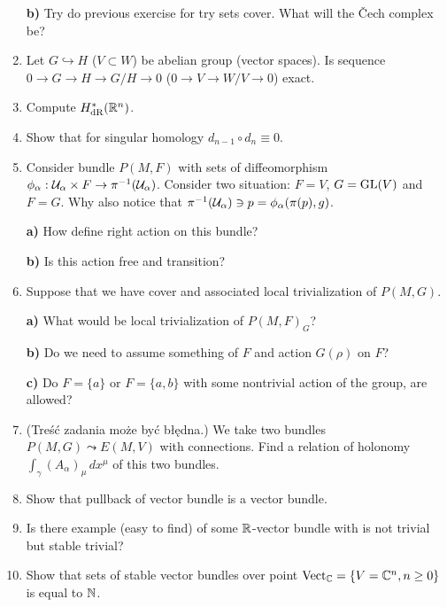 \documentclass[a4paper,11pt]{article}
\begin{document}
\begin{enumerate}
  \textbf{b)} Try do previous exercise for try sets cover. What will
  the \v{C}ech complex be?

\item Let $G \hookrightarrow H$ ($V \subset W$) be abelian group (vector spaces). Is
  sequence $0 \to G \to H \to G / H \to 0$ ($0 \to V \to W / V \to 0$) exact.

\item Compute $H_{ \textrm{dR} }^{ * }( \mathbb{R}^{ n } )$.

\item Show that for singular homology $d_{ n - 1 } \circ d_{ n } \equiv 0$.

\item Consider bundle $P( M, F )$ with sets of diffeomorphism
  $\phi_{ \alpha } : \mathcal{U}_{ \alpha } \times F \to \pi^{ -1 }( \mathcal{U}_{
    \alpha } )$. Consider two situation: $F = V$, $G = \mathrm{GL}( V )$ and
  $F = G$. Why also notice that
  $\pi^{ -1 }( \mathcal{U}_{ \alpha } ) \ni p = \phi_{ \alpha }( \pi( p ), g )$.

  \textbf{a)} How define right action on this bundle?

  \textbf{b)} Is this action free and transition?

\item Suppose that we have cover and associated local trivialization
  of $P( M, G )$.

  \textbf{a)} What would be local trivialization of $P( M, F )_{ G }$?

  \textbf{b)} Do we need to assume something of $F$ and action
  $G( \rho )$ on $F$?

  \textbf{c)} Do $F = \{ a \}$ or $F = \{ a, b \}$ with some nontrivial
  action of the group, are allowed?

\item (Treść zadania może być błędna.) We take two bundles
  $P( M, G ) \leadsto E( M, V )$ with connections. Find a relation of
  holonomy $\int_{ \gamma } ( A_{ \alpha } )_{ \mu } \, dx^{ \mu }$ of
  this two bundles.

\item Show that pullback of vector bundle is a vector bundle.

\item Is there example (easy to find) of some $\mathbb{R}$-vector bundle
  with is not trivial but stable trivial?

\item Show that sets of stable vector bundles over point
  $\textrm{Vect}_{ \mathbb{C} } = \{ V = \mathbb{C}^{ n }, n \geq 0 \}$ is equal to $\mathbb{N}$.


\end{enumerate}
\end{document}
